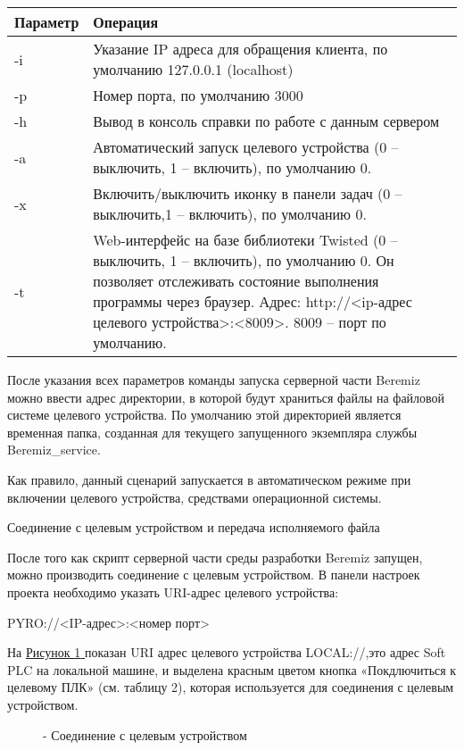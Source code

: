 \documentclass[letterpaper,10pt,russian]{sphinxmanual}
\begin{document}
\noindent\begin{tabulary}{\linewidth}{|L|L|}
\hline
\textsf{\relax 
Параметр
\unskip}\relax &\textsf{\relax 
Операция
\unskip}\relax \\
\hline
-i
&
Указание IP адреса для обращения клиента,
по умолчанию 127.0.0.1 (localhost)
\\
\hline
-p
&
Номер порта, по умолчанию 3000
\\
\hline
-h
&
Вывод в консоль справки по работе с данным сервером
\\
\hline
-a
&
Автоматический запуск целевого устройства (0 – выключить, 1 – включить),
по умолчанию 0.
\\
\hline
-x
&
Включить/выключить иконку в панели задач (0 – выключить,1 – включить),
по умолчанию 0.
\\
\hline
-t
&
Web-интерфейс на базе библиотеки Twisted (0 – выключить, 1 – включить),
по умолчанию 0.
Он позволяет отслеживать состояние выполнения программы через браузер.
Адрес: http://\textless{}ip-адрес целевого устройства\textgreater{}:\textless{}8009\textgreater{}.
8009 – порт по умолчанию.
\\
\hline\end{tabulary}


После указания всех параметров команды запуска серверной части Beremiz
можно ввести адрес директории, в которой будут храниться файлы на
файловой системе целевого устройства. По умолчанию этой директорией
является временная папка, созданная для текущего запущенного экземпляра
службы Beremiz\_service.

Как правило, данный сценарий запускается в автоматическом режиме при
включении целевого устройства, средствами операционной системы.

Соединение с целевым устройством и передача исполняемого файла

После того как скрипт серверной части среды разработки Beremiz запущен,
можно производить соединение с целевым устройством. В панели настроек
проекта необходимо указать URI-адрес целевого устройства:

PYRO://\textless{}IP-адрес\textgreater{}:\textless{}номер порт\textgreater{}

На \hyperref[usage_guide/work_with_project:image210]{Рисунок \ref{usage_guide/work_with_project:image210} } показан URI адрес целевого устройства LOCAL://,это адрес
Soft PLC на локальной машине, и выделена красным цветом кнопка
«Покдлючиться к целевому ПЛК» (см. таблицу 2), которая используется для
соединения с целевым устройством.
\begin{figure}[htbp]
\centering
\capstart

\noindent{}
\caption{- Соединение с целевым устройством}\label{usage_guide/work_with_project:image210}\end{figure}
\end{document}
